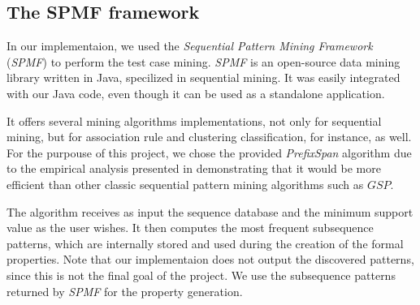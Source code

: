 \subsection{The SPMF framework}
\label{sec-spmf}

In our implementaion, we used the \textit{Sequential Pattern Mining Framework} (\textit{SPMF})\cite{spmf} to perform the test case mining. \textit{SPMF} is an open-source data mining library written in Java, specilized in sequential mining. It was easily integrated with our Java code, even though it can be used as a standalone application.

It offers several mining algorithms implementations, not only for sequential mining, but for association rule and clustering classification, for instance, as well. For the purpouse of this project, we chose the provided \textit{PrefixSpan} algorithm due to the empirical analysis presented in \cite{Pei} demonstrating that it would be more efficient than other classic sequential pattern mining algorithms such as $GSP$.

The algorithm receives as input the sequence database and the minimum support value as the user wishes. It then computes the most frequent subsequence patterns, which are internally stored and used during the creation of the formal properties. Note that our implementaion does not output the discovered patterns, since this is not the final goal of the project. We use the subsequence patterns returned by \textit{SPMF} for the property generation. 


